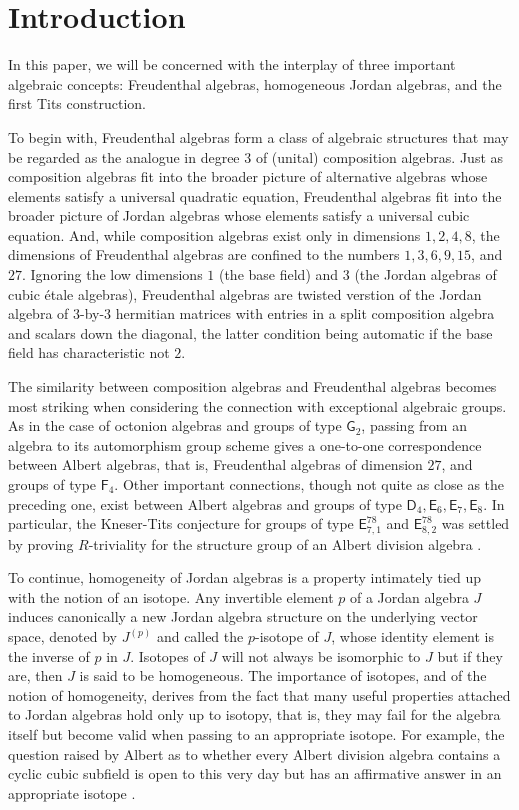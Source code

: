 \documentclass{amsart}
\theoremstyle{definition} %
\theoremstyle{remark} %
\renewcommand{\:}{\colon\,}
\newcommand{\skiprootsystem}{\mathsf}
\newcommand{\rsF}{\skiprootsystem{F}_4}
\newcommand{\rsG}{\skiprootsystem{G}_2}
\newcommand{\rsD}{\skiprootsystem{D}}
\newcommand{\rsE}{\skiprootsystem{E}}
\numberwithin{equation}{section}
\begin{document}
\setcounter{tocdepth}{1}
\tableofcontents

\section{Introduction}

In this paper, we will be concerned with the interplay of three important algebraic concepts: Freudenthal algebras, homogeneous Jordan algebras, and the first Tits construction.

To begin with, Freudenthal algebras form a class of algebraic structures that may be regarded as the analogue in degree $3$ of (unital) composition algebras. Just as composition algebras fit into the broader picture of alternative algebras whose elements satisfy a universal quadratic equation, Freudenthal algebras fit into the broader picture of Jordan algebras whose elements satisfy a universal cubic equation. And, while composition algebras exist only in dimensions $1,2,4,8$, the dimensions of Freudenthal algebras are confined to the numbers $1,3,6,9,15$, and $27$. Ignoring the low dimensions $1$ (the base field) and $3$ (the Jordan algebras of cubic \'etale algebras), Freudenthal algebras are twisted verstion of the Jordan algebra of $3$-by-$3$ hermitian matrices with entries in a split composition algebra and scalars down the diagonal, the latter condition being automatic if the base field has characteristic not $2$.

The similarity between composition algebras and Freudenthal algebras becomes most striking when considering the connection with exceptional algebraic groups. As in the case of octonion algebras and groups of type $\rsG$, passing from an algebra to its automorphism group scheme gives a one-to-one correspondence between Albert algebras, that is, Freudenthal algebras of dimension $27$, and groups of type $\rsF$. Other important connections, though not quite as close as the preceding one, exist between Albert algebras and groups of type $\rsD_4,\rsE_6,\rsE_7,\rsE_8$. In particular, the Kneser-Tits conjecture for groups of type $\rsE^{78}_{7,1}$ and $\rsE^{78}_{8,2}$ was settled by proving $R$-triviality for the structure group of an Albert division algebra \cite{MR4345011, MR4474885}.

To continue, homogeneity of Jordan algebras is a property intimately tied up with the notion of an isotope. Any invertible element $p$ of a Jordan algebra $J$ induces canonically  a new Jordan algebra structure on the underlying vector space, denoted by $J^{(p)}$ and called the $p$-isotope of $J$, whose identity element is the inverse of $p$ in $J$. Isotopes of $J$ will not always be isomorphic to $J$ but if they are, then $J$ is said to be homogeneous. The importance of isotopes, and of the notion of homogeneity,  derives from the fact that many useful properties attached to Jordan algebras hold only up to isotopy, that is, they may fail for the algebra itself but become valid  when passing to an appropriate isotope. For example, the question raised by Albert \cite{MR182647} as to whether every Albert division algebra contains a cyclic cubic subfield is open to this very day but has an affirmative answer in an appropriate isotope \cite{MR4242148}.
\end{document}
